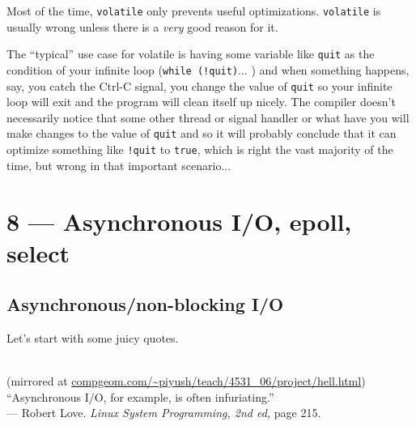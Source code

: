 \documentclass[a4paper]{report}
\begin{document}
Most of the time, {\tt volatile} only prevents useful
optimizations. {\tt volatile} is usually wrong unless there is a
\emph{very} good reason for it.

The ``typical'' use case for volatile is having some variable like \texttt{quit} as the condition of your infinite loop (\texttt{while (!quit)}... ) and when something happens, say, you catch the Ctrl-C signal, you change the value of \texttt{quit} so your infinite loop will exit and the program will clean itself up nicely. The compiler doesn't necessarily notice that some other thread or signal handler or what have you will make changes to the value of \texttt{quit} and so it will probably conclude that it can optimize something like \texttt{!quit} to \texttt{true}, which is right the vast majority of the time, but wrong in that important scenario...

  








\chapter*{8 --- Asynchronous I/O, epoll, select}


\section*{Asynchronous/non-blocking I/O}

Let's start with some juicy quotes.

\begin{center}
  \\
{\scriptsize (mirrored at \url{compgeom.com/~piyush/teach/4531_06/project/hell.html})}
   \\[2em]

   ``Asynchronous I/O, for example, is often infuriating.''\\
\hfill --- Robert Love. {\em Linux System Programming, 2nd ed, } page 215.

\end{center}
\end{document}
